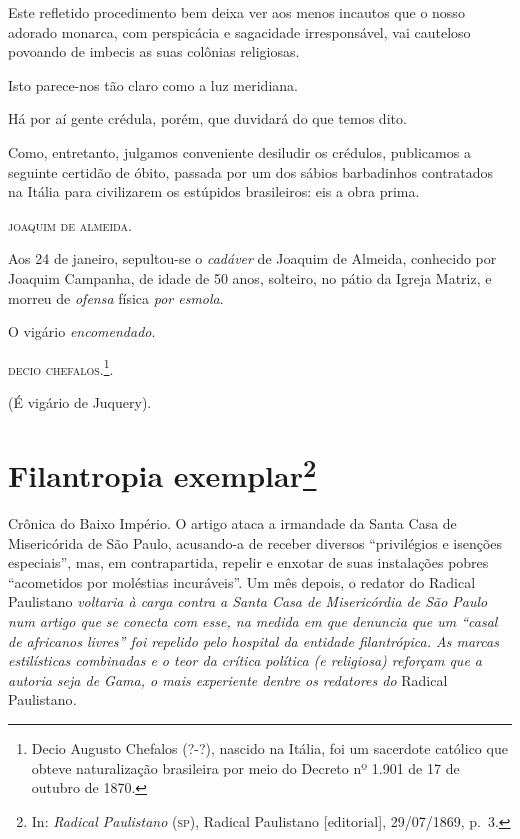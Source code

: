 Este refletido procedimento bem deixa ver aos menos incautos que o nosso
adorado monarca, com perspicácia e sagacidade irresponsável, vai
cauteloso povoando de imbecis as suas colônias religiosas.

Isto parece-nos tão claro como a luz meridiana.

Há por aí gente crédula, porém, que duvidará do que temos dito.

Como, entretanto, julgamos conveniente desiludir os crédulos, publicamos
a seguinte certidão de óbito, passada por um dos sábios barbadinhos
contratados na Itália para civilizarem os estúpidos brasileiros: eis a
obra prima.
\begin{flushright}
\textsc{joaquim de almeida}.
\end{flushright}
Aos 24 de janeiro, sepultou-se o \emph{cadáver} de Joaquim de
Almeida, conhecido por Joaquim Campanha, de idade de 50 anos, solteiro,
no pátio da Igreja Matriz, e morreu de \emph{ofensa} física
\emph{por esmola}.

O vigário \emph{encomendado}.

\textsc{decio chefalos}.\footnote{Decio Augusto Chefalos (?-?), nascido na
  Itália, foi um sacerdote católico que obteve naturalização brasileira
  por meio do Decreto nº 1.901 de 17 de outubro de 1870.}.

(É vigário de Juquery).

\chapter{Filantropia exemplar\footnote{In: \emph{Radical Paulistano} (\textsc{sp}),
  Radical Paulistano {[}editorial{]}, 29/07/1869, p.~3.}}

\begin{didascalia}
Crônica do Baixo Império. O artigo ataca a irmandade da Santa Casa de
Misericórida de São Paulo, acusando-a de receber diversos ``privilégios e
isenções especiais'', mas, em contrapartida, repelir e enxotar de suas
instalações pobres ``acometidos por moléstias incuráveis''. Um mês depois,
o redator do Radical Paulistano \emph{voltaria à carga contra a Santa
Casa de Misericórdia de São Paulo num artigo que se conecta com esse, na
medida em que denuncia que um ``casal de africanos livres'' foi repelido
pelo hospital da entidade filantrópica. As marcas estilísticas
combinadas e o teor da crítica política (e religiosa) reforçam que a
autoria seja de Gama, o mais experiente dentre os redatores do} Radical
Paulistano\emph{.}
\end{didascalia}




